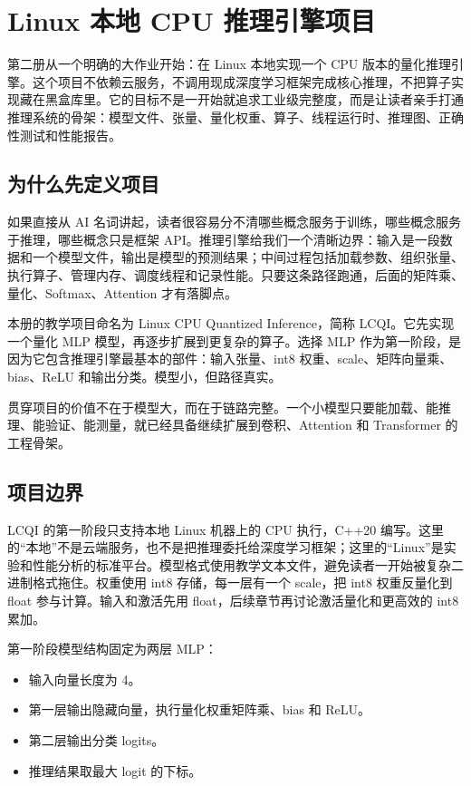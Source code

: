 \chapter{Linux 本地 CPU 推理引擎项目}

第二册从一个明确的大作业开始：在 Linux 本地实现一个 CPU 版本的量化推理引擎。这个项目不依赖云服务，不调用现成深度学习框架完成核心推理，不把算子实现藏在黑盒库里。它的目标不是一开始就追求工业级完整度，而是让读者亲手打通推理系统的骨架：模型文件、张量、量化权重、算子、线程运行时、推理图、正确性测试和性能报告。

\section{为什么先定义项目}

如果直接从 AI 名词讲起，读者很容易分不清哪些概念服务于训练，哪些概念服务于推理，哪些概念只是框架 API。推理引擎给我们一个清晰边界：输入是一段数据和一个模型文件，输出是模型的预测结果；中间过程包括加载参数、组织张量、执行算子、管理内存、调度线程和记录性能。只要这条路径跑通，后面的矩阵乘、量化、Softmax、Attention 才有落脚点。

本册的教学项目命名为 Linux CPU Quantized Inference，简称 LCQI。它先实现一个量化 MLP 模型，再逐步扩展到更复杂的算子。选择 MLP 作为第一阶段，是因为它包含推理引擎最基本的部件：输入张量、int8 权重、scale、矩阵向量乘、bias、ReLU 和输出分类。模型小，但路径真实。

\begin{keyidea}
贯穿项目的价值不在于模型大，而在于链路完整。一个小模型只要能加载、能推理、能验证、能测量，就已经具备继续扩展到卷积、Attention 和 Transformer 的工程骨架。
\end{keyidea}

\section{项目边界}

LCQI 的第一阶段只支持本地 Linux 机器上的 CPU 执行，C++20 编写。这里的“本地”不是云端服务，也不是把推理委托给深度学习框架；这里的“Linux”是实验和性能分析的标准平台。模型格式使用教学文本文件，避免读者一开始被复杂二进制格式拖住。权重使用 int8 存储，每一层有一个 scale，把 int8 权重反量化到 float 参与计算。输入和激活先用 float，后续章节再讨论激活量化和更高效的 int8 累加。

第一阶段模型结构固定为两层 MLP：

\begin{itemize}
\item 输入向量长度为 4。
\item 第一层输出隐藏向量，执行量化权重矩阵乘、bias 和 ReLU。
\item 第二层输出分类 logits。
\item 推理结果取最大 logit 的下标。
\end{itemize}

